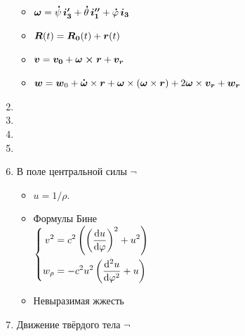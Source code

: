 \documentclass[draft,landscape,timbord]{notes}
\begin{document}
\begin{multicols*}{3}
\begin{enumerate}
    \begin{itemize}[$\triangleright$]
      \item $\v \omega = \dot\psi\,\v{i_3'} + \dot\theta\,\v{i_1''} + \dot\varphi\,\v{i_3} $
      \item $\v R (t) = \v{R_0} (t) + \v r(t)$
      \item $\v v = \v {v_0} + \v{\omega \times r} + \v{v_r}$
      \item $\v w = \v w_0 + \dot{\v \omega} \times \v r 
        + \v \omega \times (\v \omega \times \v r) + 2 \v \omega \times \v{v_r} + \v{w_r}$
    \end{itemize}
  \item  
  \item  
  \item  
  \item  
  \item В поле центральной силы $\neg$
    \begin{itemize}[$\triangleright$]
      \item $u = 1/\rho$.
      \item  Формулы Бине \\
        $\left\{\begin{aligned}
          v^2 &= c^2 \left(\left(\fder{u}{\varphi}\right)^2 + u^2 \right) \\
          w_\rho &= -c^2 u^2 \left(\fder[2]{u}{\varphi} + u \right)
      \end{aligned}\right.$
    \item Невыразимая жжесть
    \end{itemize}
  \item \quest\flame Движение твёрдого тела $\neg$
\end{enumerate}
\end{multicols*}
\end{document}
